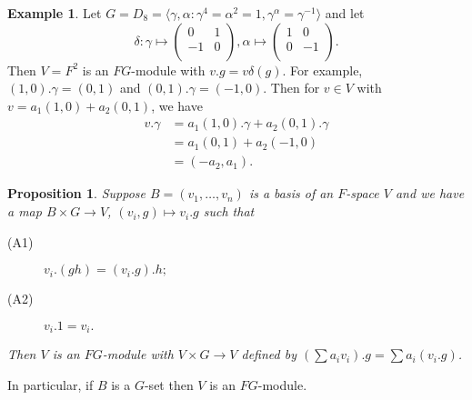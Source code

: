 \documentclass[12pt]{amsart}
\newtheorem{proposition}[theorem]{Proposition}
\theoremstyle{definition}
\newtheorem{example}[theorem]{Example}
\begin{document}
\begin{example}
Let $G=D_8=\langle\gamma,\alpha:\gamma^4=\alpha^2=1,\gamma^{\alpha}=\gamma^{-1}\rangle$ and let
$$\delta:\gamma\mapsto\left(\begin{array}{cc}
0 & 1 \\ -1 & 0 \\
\end{array}\right),
\alpha\mapsto\left(\begin{array}{cc}
1 & 0 \\ 0 & -1 \\
\end{array}\right).$$
Then $V=F^2$ is an $FG$-module with $v.g=v\delta(g).$  For example, $(1,0).\gamma=(0,1)$ and $(0,1).\gamma=(-1,0)$.  Then for $v\in V$ with $v=a_1(1,0)+a_2(0,1)$, we have
\begin{equation*}
\begin{split}
v.\gamma &= a_1(1,0).\gamma+a_2(0,1).\gamma\\
&= a_1(0,1)+a_2(-1,0)\\
&= (-a_2,a_1).
\end{split}
\end{equation*}
\end{example}

\begin{proposition}
Suppose $B=(v_1,\ldots,v_n)$ is a basis of an $F$-space $V$ and we have a map $B\times G\rightarrow V$, $(v_i, g)\mapsto v_i.g$ such that
\begin{description}
\item[(A1)] $v_i.(gh)=(v_i.g).h;$
\item[(A2)] $v_i.1=v_i.$
\end{description}
Then $V$ is an $FG$-module with $V\times G\rightarrow V$ defined by $(\sum a_i v_i).g=\sum a_i(v_i.g)$.
\end{proposition}

\noindent In particular, if $B$ is a $G$-set then $V$ is an $FG$-module.

\nocite{*}




\end{document}
